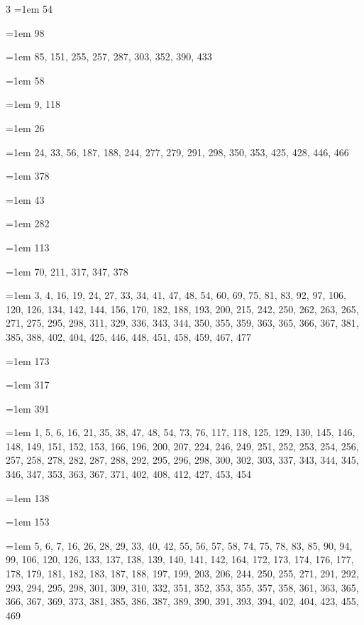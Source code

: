 \begin{multicols}{3}
\hangindent=1em  54\par
\hangindent=1em  98\par
\hangindent=1em  85, 151, 255, 257, 287, 303, 352, 390, 433\par
\hangindent=1em  58\par
\hangindent=1em  9, 118\par
\hangindent=1em  26\par
\hangindent=1em  24, 33, 56, 187, 188, 244, 277, 279, 291, 298, 350, 353, 425, 428, 446, 466\par
\hangindent=1em  378\par
\hangindent=1em  43\par
\hangindent=1em  282\par
\hangindent=1em  113\par
\hangindent=1em  70, 211, 317, 347, 378\par
\hangindent=1em  3, 4, 16, 19, 24, 27, 33, 34, 41, 47, 48, 54, 60, 69, 75, 81, 83, 92, 97, 106, 120, 126, 134, 142, 144, 156, 170, 182, 188, 193, 200, 215, 242, 250, 262, 263, 265, 271, 275, 295, 298, 311, 329, 336, 343, 344, 350, 355, 359, 363, 365, 366, 367, 381, 385, 388, 402, 404, 425, 446, 448, 451, 458, 459, 467, 477\par
\hangindent=1em  173\par
\hangindent=1em  317\par
\hangindent=1em  391\par
\hangindent=1em  1, 5, 6, 16, 21, 35, 38, 47, 48, 54, 73, 76, 117, 118, 125, 129, 130, 145, 146, 148, 149, 151, 152, 153, 166, 196, 200, 207, 224, 246, 249, 251, 252, 253, 254, 256, 257, 258, 278, 282, 287, 288, 292, 295, 296, 298, 300, 302, 303, 337, 343, 344, 345, 346, 347, 353, 363, 367, 371, 402, 408, 412, 427, 453, 454\par
\hangindent=1em  138\par
\hangindent=1em  153\par
\hangindent=1em  5, 6, 7, 16, 26, 28, 29, 33, 40, 42, 55, 56, 57, 58, 74, 75, 78, 83, 85, 90, 94, 99, 106, 120, 126, 133, 137, 138, 139, 140, 141, 142, 164, 172, 173, 174, 176, 177, 178, 179, 181, 182, 183, 187, 188, 197, 199, 203, 206, 244, 250, 255, 271, 291, 292, 293, 294, 295, 298, 301, 309, 310, 332, 351, 352, 353, 355, 357, 358, 361, 363, 365, 366, 367, 369, 373, 381, 385, 386, 387, 389, 390, 391, 393, 394, 402, 404, 423, 455, 469\par

\end{multicols}
